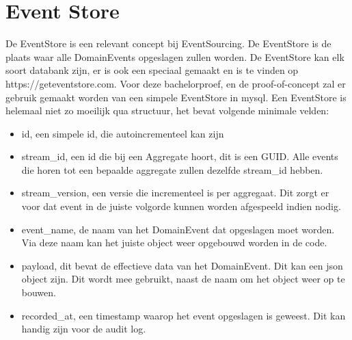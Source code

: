 
\section{Event Store}
\label{sec:event-store}

De EventStore is een relevant concept bij EventSourcing. De EventStore is de plaats waar alle DomainEvents opgeslagen zullen worden. De EventStore kan elk soort databank zijn, er is ook een speciaal gemaakt en is te vinden op https://geteventstore.com. Voor deze bachelorproef, en de proof-of-concept zal er gebruik gemaakt worden van een simpele EventStore in \gls{mysql}. Een EventStore is helemaal niet zo moeilijk qua structuur, het bevat volgende minimale velden:

\begin{itemize}
  \item{id, een simpele id, die autoincrementeel kan zijn}
  \item{stream_id, een id die bij een Aggregate hoort, dit is een \gls{GUID}. Alle events die horen tot een bepaalde aggregate zullen dezelfde stream_id hebben.}
  \item{stream_version, een versie die incrementeel is per aggregaat. Dit zorgt er voor dat event in de juiste volgorde kunnen worden afgespeeld indien nodig.}
  \item{event_name, de naam van het DomainEvent dat opgeslagen moet worden. Via deze naam kan het juiste object weer opgebouwd worden in de code.}
  \item{payload, dit bevat de effectieve data van het DomainEvent. Dit kan een json object zijn. Dit wordt mee gebruikt, naast de naam om het object weer op te bouwen.}
  \item{recorded_at, een timestamp waarop het event opgeslagen is geweest. Dit kan handig zijn voor de audit log.}
\end{itemize}
